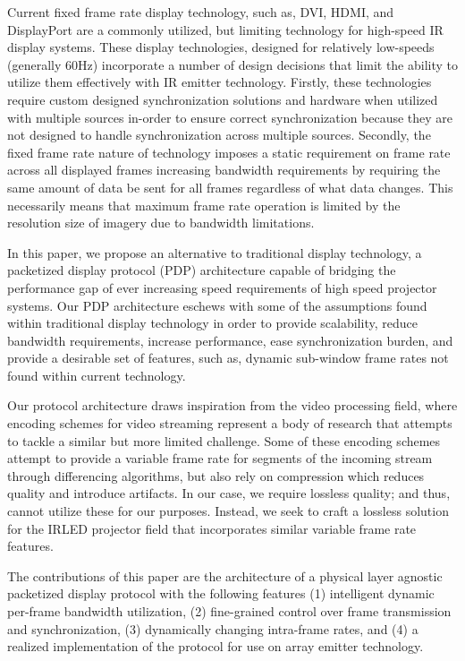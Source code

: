 \label{chap:introduction}

Current fixed frame rate display technology, such as, DVI, HDMI, and DisplayPort\cite{BhowmikEtAl2012} are a commonly utilized, but limiting technology for high-speed IR display systems\cite{EjzakEtAl2016,LaVeignePrewarski2013}. These display technologies, designed for relatively low-speeds (generally 60Hz) incorporate a number of design decisions that limit the ability to utilize them effectively with IR emitter technology. Firstly, these technologies require custom designed synchronization solutions and hardware when utilized with multiple sources in-order to ensure correct synchronization because they are not designed to handle synchronization across multiple sources. Secondly, the fixed frame rate nature of technology imposes a static requirement on frame rate across all displayed frames increasing bandwidth requirements by requiring the same amount of data be sent for all frames regardless of what data changes. This necessarily means that maximum frame rate operation is limited by the resolution size of imagery due to bandwidth limitations.

In this paper, we propose an alternative to traditional display technology, a packetized display protocol (PDP) architecture capable of bridging the performance gap of ever increasing speed requirements of high speed projector systems. Our PDP architecture eschews with some of the assumptions found within traditional display technology in order to provide scalability, reduce bandwidth requirements, increase performance, ease synchronization burden, and provide a desirable set of features, such as, dynamic sub-window frame rates not found within current technology.

Our protocol architecture draws inspiration from the video processing field, where encoding schemes for video streaming represent a body of research that attempts to tackle a similar but more limited challenge\cite{BakarEtAl2017}. Some of these encoding schemes attempt to provide a variable frame rate for segments of the incoming stream through differencing algorithms, but also rely on compression\cite{CastilloEtAl2012} which reduces quality and introduce artifacts. In our case, we require lossless quality; and thus, cannot utilize these for our purposes. Instead, we seek to craft a lossless solution for the IRLED projector field that incorporates similar variable frame rate features.

The contributions of this paper are the architecture of a physical layer agnostic packetized display protocol with the following features (1) intelligent dynamic per-frame bandwidth utilization, (2) fine-grained control over frame transmission and synchronization, (3) dynamically changing intra-frame rates, and (4) a realized implementation of the protocol for use on array emitter technology.

